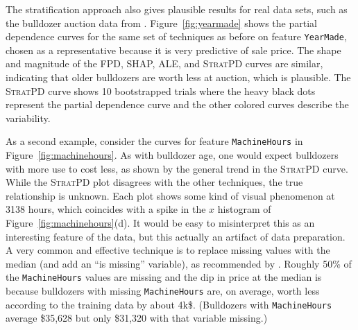 \documentclass[]{article} %
\newcommand{\figref}[1]{Figure~\ref{#1}}
\newcommand{\spd}{\fontfamily{cmr}\textsc{\small StratPD}}
\begin{document}
The stratification approach also gives plausible results for real data sets, such as the bulldozer auction data from \citet{bulldozer}. \figref{fig:yearmade} shows the partial dependence curves for the same set of techniques as before on feature {\tt\small YearMade}, chosen as a representative because it is very predictive of sale price. The shape and magnitude of the FPD, SHAP, ALE, and \spd{} curves are similar, indicating that older bulldozers are worth less at auction, which is plausible. The \spd{} curve shows 10 bootstrapped trials where the heavy black dots represent the partial dependence curve and the other colored curves describe the variability. 

As a second example, consider the curves for feature {\tt\small MachineHours} in \figref{fig:machinehours}. As with bulldozer age, one would expect bulldozers with more use to cost less, as shown by the general trend in the \spd{} curve.  While the \spd{} plot disagrees with the other techniques, the true relationship is unknown.  Each plot shows some kind of visual phenomenon at 3138 hours, which coincides with a spike in the $x$ histogram of \figref{fig:machinehours}(d).  It would be easy to misinterpret this as an interesting feature of the data, but this actually an artifact of data preparation.  A very common and effective technique is to replace missing values with the median (and add an ``is missing'' variable), as recommended by \citet{missingdata}.  Roughly 50\% of the {\tt\small MachineHours} values are missing and the dip in price at the median is because bulldozers with missing {\tt\small MachineHours} are, on average, worth less according to the training data by about 4k\$. (Bulldozers with {\tt MachineHours} average \$35,628 but only \$31,320 with that variable missing.) 
\end{document}
